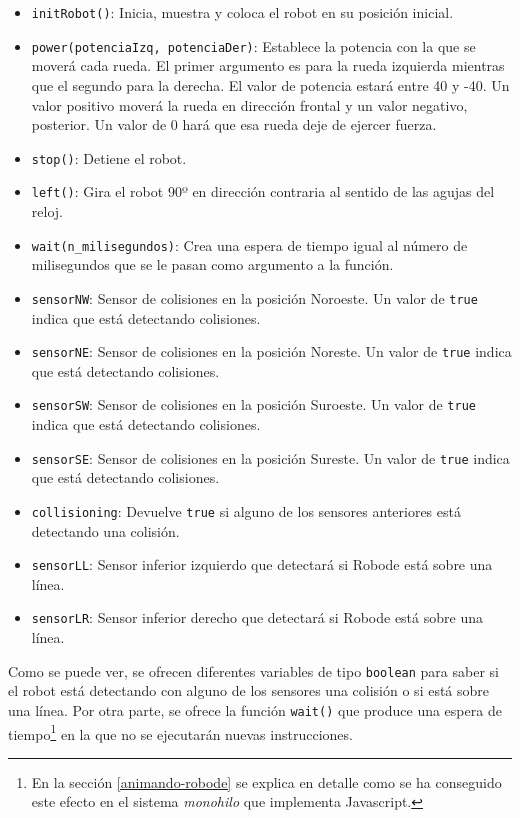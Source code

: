 \begin{itemize}
	\item \texttt{initRobot()}: Inicia, muestra y coloca el robot en su posición inicial.
	\item \texttt{power(potenciaIzq, potenciaDer)}: Establece la potencia con la que se moverá cada rueda. El primer argumento es para la rueda izquierda mientras que el segundo para la derecha. El valor de potencia estará entre 40 y -40. Un valor positivo moverá la rueda en dirección frontal y un valor negativo, posterior. Un valor de 0 hará que esa rueda deje de ejercer fuerza.
	\item \texttt{stop()}: Detiene el robot.
	\item \texttt{left()}: Gira el robot 90º en dirección contraria al sentido de las agujas del reloj.
	\item \texttt{wait(n\_milisegundos)}: Crea una espera de tiempo igual al número de milisegundos que se le pasan como argumento a la función. 
	\item \texttt{sensorNW}: Sensor de colisiones en la posición Noroeste. Un valor de \texttt{true} indica que está detectando colisiones.
	\item \texttt{sensorNE}: Sensor de colisiones en la posición Noreste. Un valor de \texttt{true} indica que está detectando colisiones.
	\item \texttt{sensorSW}: Sensor de colisiones en la posición Suroeste. Un valor de \texttt{true} indica que está detectando colisiones.
	\item \texttt{sensorSE}: Sensor de colisiones en la posición Sureste. Un valor de \texttt{true} indica que está detectando colisiones.
	\item \texttt{collisioning}: Devuelve \texttt{true} si alguno de los sensores anteriores está detectando una colisión.
	\item \texttt{sensorLL}: Sensor inferior izquierdo que detectará si Robode está sobre una línea.
	\item \texttt{sensorLR}: Sensor inferior derecho que detectará si Robode está sobre una línea.
\end{itemize}

Como se puede ver, se ofrecen diferentes variables de tipo \texttt{boolean} para saber si el robot está detectando con alguno de los sensores una colisión o si está sobre una línea. Por otra parte, se ofrece la función \texttt{wait()} que produce una espera de tiempo\footnote{En la sección \ref{animando-robode} se explica en detalle como se ha conseguido este efecto en el sistema \emph{monohilo} que implementa Javascript.} en la que no se ejecutarán nuevas instrucciones.

